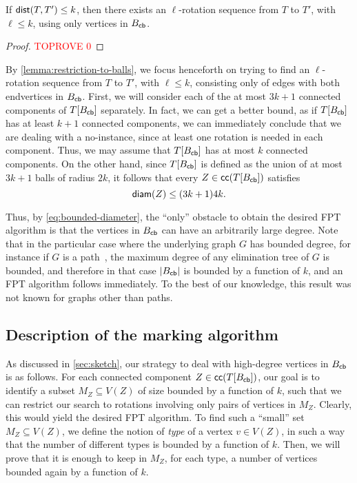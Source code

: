 \documentclass[a4paper,UKenglish,cleveref, autoref, thm-restate]{lipics-v2021}
\newcommand{\dist}{{\sf dist}\xspace}
\newcommand{\diam}{{\sf diam}\xspace}
\newcommand{\Bcb}{B_{\sf cb}\xspace}
\newcommand{\FPT}{{\sf FPT}\xspace}
\begin{document}
\begin{lemma}\label{lemma:restriction-to-balls}
If $\dist(T,T')\leq k$, then there exists an $\ell$-rotation sequence from $T$ to $T'$, with $\ell \leq k$, using only vertices in $\Bcb$.
\end{lemma}
\begin{proof}\textcolor{red}{TOPROVE 0}\end{proof}


By \autoref{lemma:restriction-to-balls}, we focus henceforth on trying to find an $\ell$-rotation sequence from $T$ to $T'$, with $\ell \leq k$, consisting only of edges with both endvertices in $\Bcb$. First, we will consider each of the at most $3k+1$ connected components of $T[\Bcb]$ separately. In fact, we can get a better bound, as if $T[\Bcb]$ has at least $k+1$ connected components, we can immediately conclude that we are dealing with a {\sf no}-instance, since at least one rotation is needed in each component. Thus, we may assume that $T[\Bcb]$ has at most $k$ connected components. On the other hand, since $T[\Bcb]$ is defined as the union of at most $3k+1$ balls of radius $2k$, it follows that every $Z \in {\sf cc}(T[\Bcb])$ satisfies
\begin{equation}\label{eq:bounded-diameter}
\diam(Z) \leq (3k+1)4k.
\end{equation}

Thus, by \autoref{eq:bounded-diameter}, the ``only'' obstacle to obtain the desired \FPT algorithm is that the vertices in $\Bcb$ can have an arbitrarily large degree. Note that in the particular case where the underlying graph $G$ has bounded degree, for instance if $G$ is a path~\cite{cleary2009rotation,kanj2017computing,li20233,lubiw2015flip}, the maximum degree of any elimination tree of $G$ is bounded, and therefore in that case $|\Bcb|$ is bounded by a function of $k$, and  an \FPT algorithm follows immediately. To the best of our knowledge, this result was not known for graphs other than paths.



\subsection{Description of the marking algorithm}
\label{sec:description-marking}

As discussed in \autoref{sec:sketch}, our strategy to deal with high-degree vertices in $\Bcb$ is as follows. For each connected component $Z \in {\sf cc}(T[\Bcb])$, our goal is to identify a subset $M_Z \subseteq V(Z)$ of size bounded by a function of $k$, such that we can restrict our search to rotations involving only pairs of vertices in $M_Z$. Clearly, this would yield the desired \FPT algorithm. To find such a ``small'' set $M_Z \subseteq V(Z)$, we define the notion of \textit{type} of a vertex $v \in V(Z)$, in such a way that the number of different types is bounded by a function of $k$. Then, we will prove that it is enough to keep in $M_Z$, for each type, a number of vertices bounded again by a function of $k$. 
\end{document}
